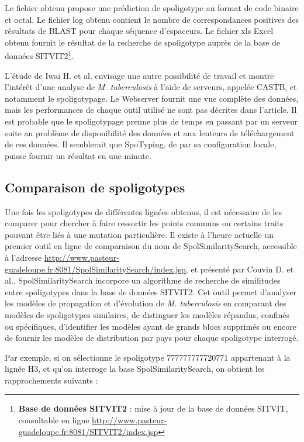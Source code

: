 \documentclass[twoside,a4paper,11pt,frenchb,openany]{report}
\begin{document}
Le fichier obtenu propose une prédiction de spoligotype au format de code binaire et octal. Le fichier log obtenu contient le nombre de correspondances positives des résultats de BLAST pour chaque séquence d'espaceurs. Le fichier xls Excel obtenu fournit le résultat de la recherche de spoligotype auprès de la base de données SITVIT2\footnote{\textbf{Base de données SITVIT2} : mise à jour de la base de données SITVIT, consultable en ligne \url{http://www.pasteur-guadeloupe.fr:8081/SITVIT2/index.jsp}}.

L'étude de Iwai H. et al.\cite{iwai} envisage une autre possibilité de travail et montre l'intérêt d'une analyse de \textit{M. tuberculosis} à l'aide de serveurs, appelée CASTB, et notamment le spoligotypage. Le Webserver fournit une vue complète des données, mais les performances de chaque outil utilisé ne sont pas décrites dans l'article. Il est probable que le spoligotypage prenne plus de temps en passant par un serveur suite au problème de disponibilité des données et aux lenteurs de téléchargement de ces données. Il semblerait que SpoTyping, de par sa configuration locale, puisse fournir un résultat en une minute.


\subsection{Comparaison de spoligotypes}

Une fois les spoligotypes de différentes lignées obtenus, il est nécessaire de les comparer pour chercher à faire ressortir les points communs ou certains traits pouvant être liés à une mutation particulière. Il existe à l'heure actuelle un premier outil en ligne de comparaison du nom de SpolSimilaritySearch, accessible à l'adresse \url{http://www.pasteur-guadeloupe.fr:8081/SpolSimilaritySearch/index.jsp}, et présenté par Couvin D. et al.\cite{couvin}. SpolSimilaritySearch incorpore un algorithme de recherche de similitudes entre spoligotypes dans la base de données SITVIT2. Cet outil permet d'analyser les modèles de propagation et d'évolution de \textit{M. tuberculosis} en comparant des modèles de spoligotypes similaires, de distinguer les modèles répandus, confinés ou spécifiques, d'identifier les modèles ayant de grands blocs supprimés ou encore de fournir les modèles de distribution par pays pour chaque spoligotype interrogé.

Par exemple, si on sélectionne le spoligotype 777777777720771 appartenant à la lignée H3, et qu'on interroge la base SpolSimilaritySearch, on obtient les rapprochements suivants :
\end{document}
